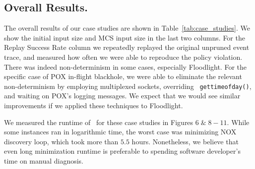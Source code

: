 \subsection{Overall Results.}

The overall results of our case studies are
shown in Table~\ref{tab:case_studies}.
We show the initial input size and MCS input size in the last two columns.
For the Replay Success Rate column we
repeatedly replayed the original unpruned event trace, and measured how often we
were able to reproduce the policy violation. There was indeed non-determinism
in some cases, especially Floodlight. For the specific case of
POX in-flight blackhole, we were able to eliminate the relevant
non-determinism by employing multiplexed sockets, overriding {\tt
gettimeofday()}, and waiting on
POX's logging messages. We expect that we would see similar improvements if we
applied these techniques to Floodlight.

We measured the runtime of \simulator~for these case studies in Figures $6\;\&\;8-11$.
While some instances ran in logarithmic time, the worst case was minimizing NOX discovery loop,
which took more than $5.5$ hours. Nonetheless, we believe that even long minimization runtime
is preferable to spending software developer's time on manual
diagnosis.

%

%

%

